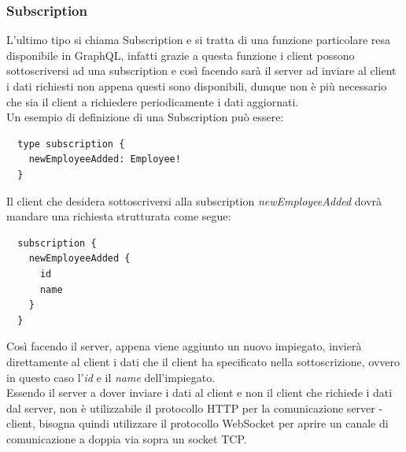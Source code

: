 \subsubsection*{Subscription}
L'ultimo tipo si chiama Subscription e si tratta di una funzione particolare resa disponibile in GraphQL, infatti grazie a questa funzione i client possono sottoscriversi ad una subscription e così facendo sarà il server ad inviare al client i dati richiesti non appena questi sono disponibili, dunque non è più necessario che sia il client a richiedere periodicamente i dati aggiornati.\\
Un esempio di definizione di una Subscription può essere:
\begin{verbatim}
  type subscription {
    newEmployeeAdded: Employee!
  }
\end{verbatim}
Il client che desidera sottoscriversi alla subscription \textit{newEmployeeAdded} dovrà mandare una richiesta strutturata come segue:
\begin{verbatim}
  subscription {
    newEmployeeAdded {
      id
      name
    }
  }
\end{verbatim}
Così facendo il server, appena viene aggiunto un nuovo impiegato, invierà direttamente al client i dati che il client ha specificato nella sottoscrizione, ovvero in questo caso l'\textit{id} e il \textit{name} dell'impiegato.\\
Essendo il server a dover inviare i dati al client e non il client che richiede i dati dal server, non è utilizzabile il protocollo HTTP per la comunicazione server - client, bisogna quindi utilizzare il protocollo WebSocket per aprire un canale di comunicazione a doppia via sopra un socket TCP.\\ \\
